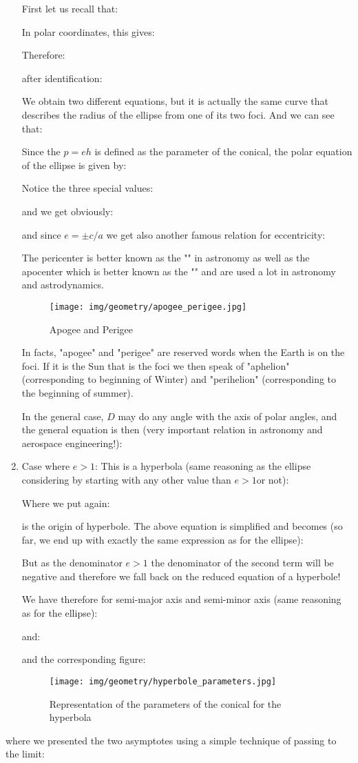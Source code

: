 \begin{enumerate}
		First let us recall that:
		
		In polar coordinates, this gives:
		
		Therefore:
		
		after identification:
		
		We obtain two different equations, but it is actually the same curve that describes the radius of the ellipse from one of its two foci. And we can see that:
		
		Since the $p=eh$ is defined as the parameter of the conical, the polar equation of the ellipse is given by:
		
		Notice the three special values:
		
		and we get obviously:
		
		and since $e=\pm c/a$ we get also another famous relation for eccentricity:
		
		The pericenter is better known as the "" in astronomy as well as the apocenter which is better known as the "" and are used a lot in astronomy and astrodynamics.
		\begin{figure}[H]
			\centering
			\texttt{[image: img/geometry/apogee\_perigee.jpg]}
			\caption{Apogee and Perigee}
		\end{figure}
		\begin{tcolorbox}[title=Remark,colframe=black,arc=10pt]
		In facts, "apogee" and "perigee" are reserved words when the Earth is on the foci. If it is the Sun that is the foci we then speak of "aphelion" (corresponding to beginning of Winter) and "perihelion" (corresponding to the beginning of summer).
		\end{tcolorbox}
		In the general case, $D$ may do any angle with the axis of polar angles, and the general equation is then (very important relation in astronomy and aerospace engineering!):
		
		
		\item Case where $e>1$:
		This is a hyperbola (same reasoning as the ellipse considering by starting with any other value than $e>1 $or not):
		
		Where we put again:
		
		is the origin of hyperbole. The above equation is simplified and becomes (so far, we end up with exactly the same expression as for the ellipse):
		
		But as the denominator $e>1$ the denominator of the second term will be negative and therefore we fall back on the reduced equation of a hyperbole!
		
		We have therefore for semi-major axis and semi-minor axis (same reasoning as for the ellipse):
		
		and:
		
		and the corresponding figure:
		\begin{figure}[H]
			\centering
			\texttt{[image: img/geometry/hyperbole\_parameters.jpg]}
			\caption{Representation of the parameters of the conical for the hyperbola}
		\end{figure}
	\end{enumerate}
	where we presented the two asymptotes using a simple technique of passing to the limit:
	
